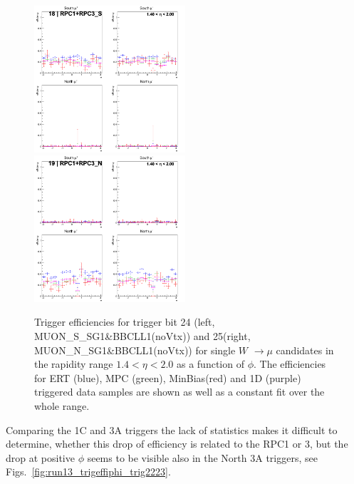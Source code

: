 \begin{figure}[h!]

  \centering
  \centering
  \includegraphics[width=0.5\textwidth]{./figures/run13_trigeffiphi_eta1_trig18_lin.png}
  \includegraphics[width=0.5\textwidth]{./figures/run13_trigeffiphi_eta1_trig19_lin.png}
  \caption{
    Trigger efficiencies for trigger bit 24 (left, MUON\_S\_SG1\&BBCLL1(noVtx))
    and 25(right, MUON\_N\_SG1\&BBCLL1(noVtx)) for single $W$ $\rightarrow \mu$
    candidates in the rapidity range $ 1.4 < \eta < 2.0$ as a function of
    $\phi$. The efficiencies for ERT (blue), MPC (green), MinBias(red) and 1D
    (purple) triggered data samples are shown as well as a constant fit over the
    whole range.
  }
  \label{fig:run13_trigeffiphi_trig1819} 
\end{figure}
\clearpage

Comparing the 1C and 3A triggers the lack of statistics makes it difficult to
determine, whether this drop of efficiency is related to the RPC1 or 3, but the
drop at positive $\phi$ seems to be visible also in the North 3A triggers, see
Figs.~\ref{fig:run13_trigeffiphi_trig2223}.

